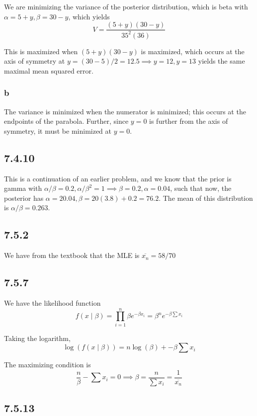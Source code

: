 \documentclass[12pt,letterpaper]{article}
\theoremstyle{definition}
\begin{document}
We are minimizing the variance of the posterior distribution, which is beta with
$\alpha = 5 + y, \beta = 30 -y$, which yields
\[
  V = \frac{(5+y)(30-y)}{35^2(36)}
\]

This is maximized when $(5+y)(30-y)$ is maximized, which occurs at the axis of
symmetry at $y = (30 - 5) / 2 = 12.5 \implies y=12, y=13$ yields the same
maximal mean squared error.


\subsubsection*{b}

The variance is minimized when the numerator is minimized; this occurs at the
endpoints of the parabola. Further, since $y=  0$ is further from the axis of
symmetry, it must be minimized at $y = 0$.

\subsection*{7.4.10}

This is a continuation of an earlier problem, and we know that the prior is
gamma with $\alpha/ \beta = 0.2, \alpha/\beta^2 = 1 \implies \beta = 0.2, \alpha
= 0.04$, such that now, the posterior has $\alpha = 20.04, \beta = 20(3.8) + 0.2
= 76.2$. The mean of this distribution is $\alpha / \beta = 0.263$.

\subsection*{7.5.2}

We have from the textbook that the MLE is $\overline{x_n} = 58/70$

\subsection*{7.5.7}

We have the likelihood function
\[
  f(x \mid \beta) = \prod_{i=1}^n \beta e^{-\beta x_i} = \beta^n e^{-\beta \sum
  x_i}
\]

Taking the logarithm,
\[
  \log(f(x \mid \beta)) = n\log(\beta) + -\beta\sum x_i
\]

The maximizing condition is
\[
  \frac{n}{\beta} - \sum x_i = 0 \implies \beta = \frac{n}{\sum x_i} = \frac{1}{\overline{x_n}}
\]

\subsection*{7.5.13}
\end{document}
